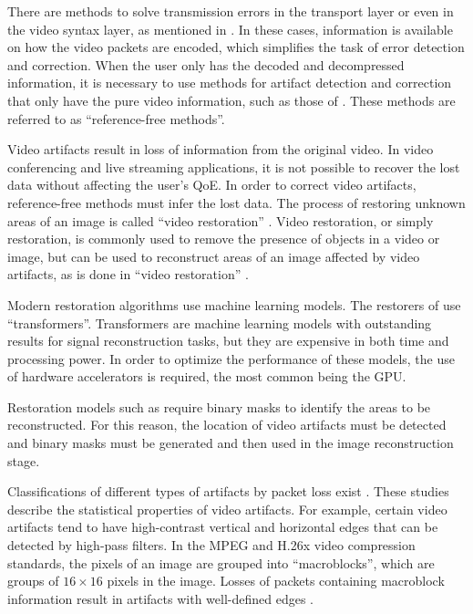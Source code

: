 There are methods to solve transmission errors in the transport layer or even in the video syntax layer, as mentioned in \cite{Sanyal2021}. In these cases, information is available on how the video packets are encoded, which simplifies the task of error detection and correction. When the user only has the decoded and decompressed information, it is necessary to use methods for artifact detection and correction that only have the pure video information, such as those of \cite{Vranjes2018, Sanyal2021,Goodall2019}. These methods are referred to as ``reference-free methods''.

Video artifacts result in loss of information from the original video. In video conferencing and live streaming applications, it is not possible to recover the lost data without affecting the user's QoE. In order to correct video artifacts, reference-free methods must infer the lost data. The process of restoring unknown areas of an image is called ``video restoration'' \cite{Li2022, Zhou2021}. Video restoration, or simply restoration, is commonly used to remove the presence of objects in a video or image, but can be used to reconstruct areas of an image affected by video artifacts, as is done in ``video restoration'' \cite{Dong2023, Brenes2022}.

Modern restoration algorithms use machine learning models. The restorers of \cite{Li2022, Zhou2021, Liu2021} use ``transformers''. Transformers are machine learning models with outstanding results for signal reconstruction tasks, but they are expensive in both time and processing power. In order to optimize the performance of these models, the use of hardware accelerators is required, the most common being the GPU.

Restoration models such as \cite{Li2022} require binary masks to identify the areas to be reconstructed. For this reason, the location of video artifacts must be detected and binary masks must be generated and then used in the image reconstruction stage.

Classifications of different types of artifacts by packet loss exist \cite{Greengrass2009, Glavota2016}. These studies describe the statistical properties of video artifacts. For example, certain video artifacts tend to have high-contrast vertical and horizontal edges that can be detected by high-pass filters. In the MPEG and H.26x video compression standards, the pixels of an image are grouped into ``macroblocks'', which are groups of $16 \times 16$ pixels in the image. Losses of packets containing macroblock information result in artifacts with well-defined edges \cite{Vranjes2019, Glavota2018}.

